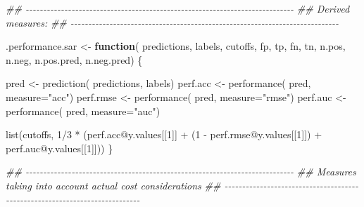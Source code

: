 \documentclass[
  letterpaper,
  DIV=11,
  numbers=noendperiod]{scrartcl}
\newenvironment{Shaded}{\begin{snugshade}}{\end{snugshade}}
\newcommand{\AttributeTok}[1]{\textcolor[rgb]{0.40,0.45,0.13}{#1}}
\newcommand{\ControlFlowTok}[1]{\textcolor[rgb]{0.00,0.23,0.31}{\textbf{#1}}}
\newcommand{\DecValTok}[1]{\textcolor[rgb]{0.68,0.00,0.00}{#1}}
\newcommand{\DocumentationTok}[1]{\textcolor[rgb]{0.37,0.37,0.37}{\textit{#1}}}
\newcommand{\FunctionTok}[1]{\textcolor[rgb]{0.28,0.35,0.67}{#1}}
\newcommand{\NormalTok}[1]{\textcolor[rgb]{0.00,0.23,0.31}{#1}}
\newcommand{\OtherTok}[1]{\textcolor[rgb]{0.00,0.23,0.31}{#1}}
\newcommand{\SpecialCharTok}[1]{\textcolor[rgb]{0.37,0.37,0.37}{#1}}
\newcommand{\StringTok}[1]{\textcolor[rgb]{0.13,0.47,0.30}{#1}}
\begin{document}
\begin{Shaded}
\begin{Highlighting}[]
\DocumentationTok{\#\# {-}{-}{-}{-}{-}{-}{-}{-}{-}{-}{-}{-}{-}{-}{-}{-}{-}{-}{-}{-}{-}{-}{-}{-}{-}{-}{-}{-}{-}{-}{-}{-}{-}{-}{-}{-}{-}{-}{-}{-}{-}{-}{-}{-}{-}{-}{-}{-}{-}{-}{-}{-}{-}{-}{-}{-}{-}{-}{-}{-}{-}{-}{-}{-}{-}{-}{-}{-}{-}{-}{-}{-}{-}{-}{-}{-}}
\DocumentationTok{\#\# Derived measures:}
\DocumentationTok{\#\# {-}{-}{-}{-}{-}{-}{-}{-}{-}{-}{-}{-}{-}{-}{-}{-}{-}{-}{-}{-}{-}{-}{-}{-}{-}{-}{-}{-}{-}{-}{-}{-}{-}{-}{-}{-}{-}{-}{-}{-}{-}{-}{-}{-}{-}{-}{-}{-}{-}{-}{-}{-}{-}{-}{-}{-}{-}{-}{-}{-}{-}{-}{-}{-}{-}{-}{-}{-}{-}{-}{-}{-}{-}{-}{-}{-}}

\NormalTok{.performance.sar }\OtherTok{\textless{}{-}} \ControlFlowTok{function}\NormalTok{( predictions, labels, cutoffs, fp, tp, fn, tn,}
\NormalTok{           n.pos, n.neg, n.pos.pred, n.neg.pred) \{}

\NormalTok{    pred }\OtherTok{\textless{}{-}} \FunctionTok{prediction}\NormalTok{( predictions, labels)}
\NormalTok{    perf.acc }\OtherTok{\textless{}{-}} \FunctionTok{performance}\NormalTok{( pred, }\AttributeTok{measure=}\StringTok{"acc"}\NormalTok{)}
\NormalTok{    perf.rmse }\OtherTok{\textless{}{-}} \FunctionTok{performance}\NormalTok{( pred, }\AttributeTok{measure=}\StringTok{"rmse"}\NormalTok{)}
\NormalTok{    perf.auc }\OtherTok{\textless{}{-}} \FunctionTok{performance}\NormalTok{( pred, }\AttributeTok{measure=}\StringTok{"auc"}\NormalTok{)}

    \FunctionTok{list}\NormalTok{(cutoffs,}
         \DecValTok{1}\SpecialCharTok{/}\DecValTok{3} \SpecialCharTok{*}\NormalTok{ (perf.acc}\SpecialCharTok{@}\NormalTok{y.values[[}\DecValTok{1}\NormalTok{]] }\SpecialCharTok{+}
\NormalTok{                (}\DecValTok{1} \SpecialCharTok{{-}}\NormalTok{ perf.rmse}\SpecialCharTok{@}\NormalTok{y.values[[}\DecValTok{1}\NormalTok{]]) }\SpecialCharTok{+}
\NormalTok{                perf.auc}\SpecialCharTok{@}\NormalTok{y.values[[}\DecValTok{1}\NormalTok{]]))}
\NormalTok{\}}

\DocumentationTok{\#\# {-}{-}{-}{-}{-}{-}{-}{-}{-}{-}{-}{-}{-}{-}{-}{-}{-}{-}{-}{-}{-}{-}{-}{-}{-}{-}{-}{-}{-}{-}{-}{-}{-}{-}{-}{-}{-}{-}{-}{-}{-}{-}{-}{-}{-}{-}{-}{-}{-}{-}{-}{-}{-}{-}{-}{-}{-}{-}{-}{-}{-}{-}{-}{-}{-}{-}{-}{-}{-}{-}{-}{-}{-}{-}{-}{-}}
\DocumentationTok{\#\# Measures taking into account actual cost considerations}
\DocumentationTok{\#\# {-}{-}{-}{-}{-}{-}{-}{-}{-}{-}{-}{-}{-}{-}{-}{-}{-}{-}{-}{-}{-}{-}{-}{-}{-}{-}{-}{-}{-}{-}{-}{-}{-}{-}{-}{-}{-}{-}{-}{-}{-}{-}{-}{-}{-}{-}{-}{-}{-}{-}{-}{-}{-}{-}{-}{-}{-}{-}{-}{-}{-}{-}{-}{-}{-}{-}{-}{-}{-}{-}{-}{-}{-}{-}{-}{-}}


\end{Highlighting}
\end{Shaded}
\end{document}
